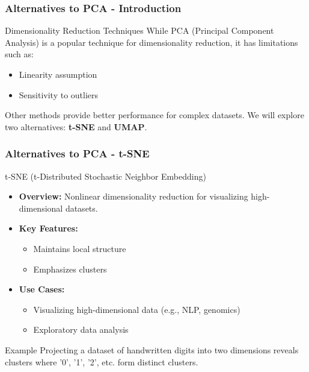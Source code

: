 \documentclass[aspectratio=169]{beamer}
\begin{document}
\begin{frame}[fragile]
    \frametitle{Alternatives to PCA - Introduction}
    \begin{block}{Dimensionality Reduction Techniques}
        While PCA (Principal Component Analysis) is a popular technique for dimensionality reduction, it has limitations such as:
        \begin{itemize}
            \item Linearity assumption
            \item Sensitivity to outliers
        \end{itemize}
        Other methods provide better performance for complex datasets. We will explore two alternatives: \textbf{t-SNE} and \textbf{UMAP}.
    \end{block}
\end{frame}

\begin{frame}[fragile]
    \frametitle{Alternatives to PCA - t-SNE}
    \begin{block}{t-SNE (t-Distributed Stochastic Neighbor Embedding)}
        \begin{itemize}
            \item \textbf{Overview:} Nonlinear dimensionality reduction for visualizing high-dimensional datasets.
            \item \textbf{Key Features:}
                \begin{itemize}
                    \item Maintains local structure
                    \item Emphasizes clusters
                \end{itemize}
            \item \textbf{Use Cases:}
                \begin{itemize}
                    \item Visualizing high-dimensional data (e.g., NLP, genomics)
                    \item Exploratory data analysis
                \end{itemize}
        \end{itemize}
    \end{block}
    
    \begin{block}{Example}
        Projecting a dataset of handwritten digits into two dimensions reveals clusters where '0', '1', '2', etc. form distinct clusters.
    \end{block}
\end{frame}
\end{document}
